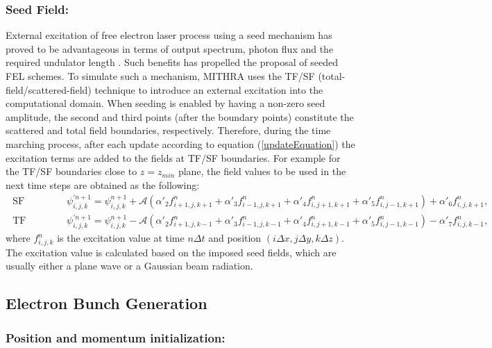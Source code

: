 \subsubsection{Seed Field:}

External excitation of free electron laser process using a seed mechanism has proved to be advantageous in terms of output spectrum, photon flux and the required undulator length  \cite{pellegrini2016physics,FEL2}.
%
Such benefits has propelled the proposal of seeded FEL schemes.
%
To simulate such a mechanism, MITHRA uses the TF/SF (total-field/scattered-field) technique to introduce an external excitation into the computational domain.
%
When seeding is enabled by having a non-zero seed amplitude, the second and third points (after the boundary points) constitute the scattered and total field boundaries, respectively.
%
Therefore, during the time marching process, after each update according to equation (\ref{updateEquation}) the excitation terms are added to the fields at TF/SF boundaries.
%
For example for the TF/SF boundaries close to $z=z_{min}$ plane, the field values to be used in the next time steps are obtained as the following:
%
\begin{align}
\text{ SF boundary:  } & \psi_{i,j,k}^{'n+1} = \psi_{i,j,k}^{n+1} + \mathcal{A} ( \alpha'_2 f_{i+1,j,k+1}^n  + \alpha'_3 f_{i-1,j,k+1}^n + \alpha'_4 f_{i,j+1,k+1}^n + \alpha'_5 f_{i,j-1,k+1}^n ) + \alpha'_6 f_{i,j,k+1}^n, \nonumber \\
\text{ TF boundary:  } & \psi_{i,j,k}^{'n+1} = \psi_{i,j,k}^{n+1} - \mathcal{A} ( \alpha'_2 f_{i+1,j,k-1}^n  + \alpha'_3 f_{i-1,j,k-1}^n + \alpha'_4 f_{i,j+1,k-1}^n + \alpha'_5 f_{i,j-1,k-1}^n ) - \alpha'_7 f_{i,j,k-1}^n,
\end{align}
%
where $f_{i,j,k}^n$ is the excitation value at time $n\Delta t$ and position $(i\Delta x,j\Delta y,k\Delta z)$.
%
The excitation value is calculated based on the imposed seed fields, which are usually either a plane wave or a Gaussian beam radiation.

\subsection{Electron Bunch Generation}

\subsubsection{Position and momentum initialization:}


